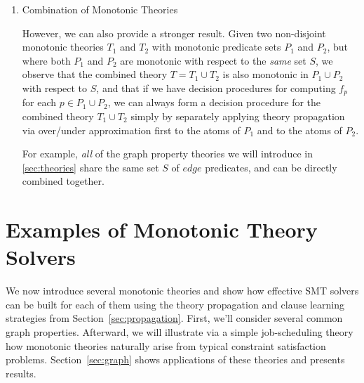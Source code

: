 \documentclass[runningheads]{llncs}
\begin{document}
{\begin{enumerate}
Given a monotonic theory that contains in $P$ both less-than ($<$) and less-or-equal-than ($\leq$) predicates over some domain, we can recover equality and inequality semantics for that domain by adding extra constraints in the SAT solver (for example, by asserting $(x \leq 5) \land \lnot(x < 5)$), and then proceed with Nelson-Oppen as normal. This will suffice so long as both comparison operators are defined in $T$ for the sorts that are shared between the two theories, and comes with the usual restrictions of Nelson-Oppen combination, including that the theories must have disjoint signatures.\\

\item{Combination of Monotonic Theories}

However, we can also provide a stronger result. Given two non-disjoint monotonic theories $T_1$ and $T_2$ with monotonic predicate sets $P_1$ and $P_2$, but where both $P_1$ and $P_2$ are monotonic with respect to the \textit{same} set $S$, we observe that the combined theory $T = T_1 \cup T_2$ is also monotonic in $P_1 \cup P_2$ with respect to $S$, and that if we have decision procedures for computing $f_p$ for each $p \in P_1 \cup P_2$, we can always form a decision procedure for the combined theory $T_1 \cup T_2$ simply by separately applying theory propagation via over/under approximation first to the atoms of $P_1$ and to the atoms of $P_2$.  

For example, \textit{all} of the graph property theories we will introduce in \autoref{sec:theories} share the same set $S$ of $edge$ predicates, and can be directly combined together.

\end{enumerate}
}

\section{Examples of Monotonic Theory Solvers \label{sec:theories}}

We now introduce several monotonic theories and show how effective SMT
solvers can be built for each of them using the theory propagation and
clause learning strategies from Section~\ref{sec:propagation}.  First,
we'll consider several common graph properties.
Afterward, we will illustrate via a simple job-scheduling theory
how monotonic theories naturally arise from
typical constraint satisfaction problems.
Section~\ref{sec:graph} shows applications of these theories
and presents results.
\end{document}
